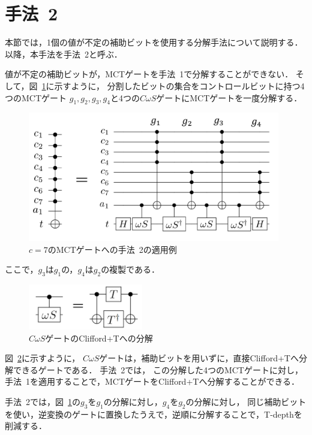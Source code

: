 \section{手法~2}
本節では，1個の値が不定の補助ビットを使用する分解手法\cite{abdessaied2016technology}について説明する．
以降，本手法を手法~2と呼ぶ．
\par
値が不定の補助ビットが，MCTゲートを手法~1で分解することができない．
そして，図~\ref{mimap}に示すように，
分割したビットの集合をコントロールビットに持つ4つのMCTゲート
$g_{1}, g_{2}, g_{3}, g_{4}$と4つの$C\omega S$ゲートにMCTゲートを一度分解する．
\begin{figure}[tbp]
  \centering
  \includegraphics[width=11cm]{img/mimapping.pdf}
  \caption{$c=7$のMCTゲートへの手法~2の適用例}
  \label{mimap}
\end{figure}
ここで，$g_{3}$は$g_{1}$の，$g_{4}$は$g_{2}$の複製である．
\begin{figure}[tbp]
  \centering
  \includegraphics[width=5cm]{img/comegas.pdf}
  \caption{$C\omega S$ゲートのClifford+Tへの分解}
  \label{comegas}
\end{figure}
図~\ref{comegas}に示すように，
$C\omega S$ゲートは，補助ビットを用いずに，直接Clifford+Tへ分解できるゲートである．
手法~2では，
この分解した4つのMCTゲートに対し，手法~1を適用することで，MCTゲートをClifford+Tへ分解することができる．
\par
手法~2では，図~\ref{mimap}の$g_{3}$を$g_{1}$の分解に対し，$g_{4}$を$g_{2}$の分解に対し，
同じ補助ビットを使い，逆変換のゲートに置換したうえで，逆順に分解することで，T-depthを削減する．
